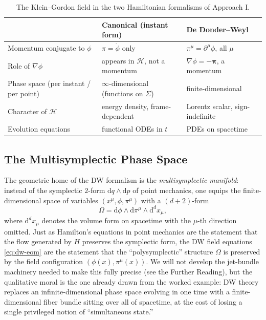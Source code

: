 \documentclass[11pt]{book}
\newcommand{\rd}{\mathrm{d}}
\newcommand{\Ham}{\mathcal{H}}
\theoremstyle{definition}
\theoremstyle{remark}
\begin{document}
\begin{table}[h]
\centering
\begin{tabular}{@{}lll@{}}
\toprule
 & Canonical (instant form) & De Donder--Weyl \\
\midrule
Momentum conjugate to $\phi$ & $\pi=\dot\phi$ only & $\pi^\mu=\partial^\mu\phi$, all $\mu$ \\
Role of $\nabla\phi$ & appears in $\Ham$, not a momentum & $\nabla\phi = -\boldsymbol\pi$, a momentum \\
Phase space (per instant / per point) & $\infty$-dimensional (functions on $\Sigma$) & finite-dimensional \\
Character of $\Ham$ & energy density, frame-dependent & Lorentz scalar, sign-indefinite \\
Evolution equations & functional ODEs in $t$ & PDEs on spacetime \\
\bottomrule
\end{tabular}
\caption{The Klein--Gordon field in the two Hamiltonian formalisms of Approach I.}
\end{table}

\subsection{The Multisymplectic Phase Space}

The geometric home of the DW formalism is the \emph{multisymplectic manifold}: instead of the symplectic $2$-form $\rd q\wedge \rd p$ of point mechanics, one equips the finite-dimensional space of variables $(x^\mu,\phi,\pi^\mu)$ with a $(d+2)$-form
\begin{equation}
\Omega = \rd\phi\wedge \rd\pi^\mu \wedge \rd^{d}x_\mu ,
\end{equation}
where $\rd^d x_\mu$ denotes the volume form on spacetime with the $\mu$-th direction omitted. Just as Hamilton's equations in point mechanics are the statement that the flow generated by $H$ preserves the symplectic form, the DW field equations \eqref{eq:dw-eom} are the statement that the ``polysymplectic'' structure $\Omega$ is preserved by the field configuration $(\phi(x),\pi^\mu(x))$. We will not develop the jet-bundle machinery needed to make this fully precise (see the Further Reading), but the qualitative moral is the one already drawn from the worked example: DW theory replaces an infinite-dimensional phase space evolving in one time with a finite-dimensional fiber bundle sitting over all of spacetime, at the cost of losing a single privileged notion of ``simultaneous state.''
\end{document}
